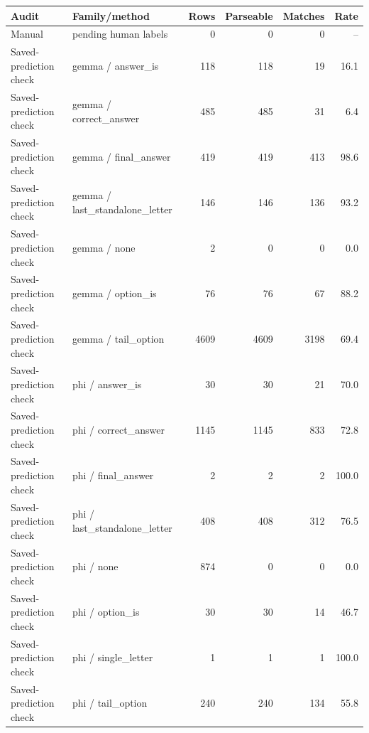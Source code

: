 \begin{tabular}{llrrrr}
\toprule
Audit & Family/method & Rows & Parseable & Matches & Rate \\
\midrule
Manual & pending human labels & 0 & 0 & 0 & -- \\
Saved-prediction check & gemma / answer_is & 118 & 118 & 19 & 16.1 \\
Saved-prediction check & gemma / correct_answer & 485 & 485 & 31 & 6.4 \\
Saved-prediction check & gemma / final_answer & 419 & 419 & 413 & 98.6 \\
Saved-prediction check & gemma / last_standalone_letter & 146 & 146 & 136 & 93.2 \\
Saved-prediction check & gemma / none & 2 & 0 & 0 & 0.0 \\
Saved-prediction check & gemma / option_is & 76 & 76 & 67 & 88.2 \\
Saved-prediction check & gemma / tail_option & 4609 & 4609 & 3198 & 69.4 \\
Saved-prediction check & phi / answer_is & 30 & 30 & 21 & 70.0 \\
Saved-prediction check & phi / correct_answer & 1145 & 1145 & 833 & 72.8 \\
Saved-prediction check & phi / final_answer & 2 & 2 & 2 & 100.0 \\
Saved-prediction check & phi / last_standalone_letter & 408 & 408 & 312 & 76.5 \\
Saved-prediction check & phi / none & 874 & 0 & 0 & 0.0 \\
Saved-prediction check & phi / option_is & 30 & 30 & 14 & 46.7 \\
Saved-prediction check & phi / single_letter & 1 & 1 & 1 & 100.0 \\
Saved-prediction check & phi / tail_option & 240 & 240 & 134 & 55.8 \\
\bottomrule
\end{tabular}
